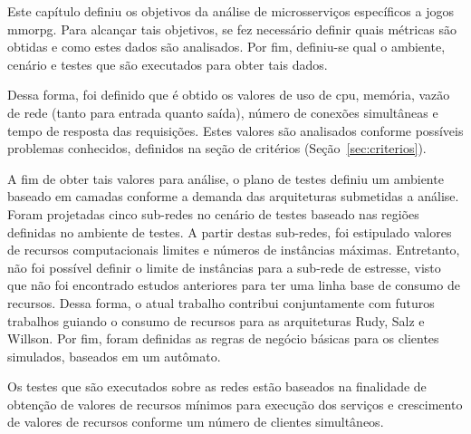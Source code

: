 Este capítulo definiu os objetivos da análise de microsserviços específicos a jogos \ac{mmorpg}.
%
Para alcançar tais objetivos, se fez necessário definir quais métricas são obtidas e como estes dados são analisados.
%
Por fim, definiu-se qual o ambiente, cenário e testes que são executados para obter tais dados.

Dessa forma, foi definido que é obtido os valores de uso de \ac{cpu}, memória, vazão de rede (tanto para entrada quanto saída), número de conexões simultâneas e tempo de resposta das requisições.
%
Estes valores são analisados conforme possíveis problemas conhecidos, definidos na seção de critérios (Seção~\ref{sec:criterios}).

A fim de obter tais valores para análise, o plano de testes definiu um ambiente baseado em camadas conforme a demanda das arquiteturas submetidas a análise.
%
Foram projetadas cinco sub-redes no cenário de testes baseado nas regiões definidas no ambiente de testes.
%
A partir destas sub-redes, foi estipulado valores de recursos computacionais limites e números de instâncias máximas.
%
Entretanto, não foi possível definir o limite de instâncias para a sub-rede de estresse, visto que não foi encontrado estudos anteriores para ter uma linha base de consumo de recursos.
%
Dessa forma, o atual trabalho contribui conjuntamente com futuros trabalhos guiando o consumo de recursos para as arquiteturas Rudy, Salz e Willson.
%
Por fim, foram definidas as regras de negócio básicas para os clientes simulados, baseados em um autômato.

Os testes que são executados sobre as redes estão baseados na finalidade de obtenção de valores de recursos mínimos para execução dos serviços e crescimento de valores de recursos conforme um número de clientes simultâneos.
